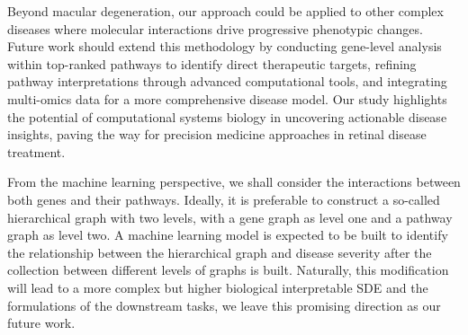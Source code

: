 \documentclass{article} %
\begin{document}
Beyond macular degeneration, our approach could be applied to other complex diseases where molecular interactions drive progressive phenotypic changes. Future work should extend this methodology by conducting gene-level analysis within top-ranked pathways to identify direct therapeutic targets, refining pathway interpretations through advanced computational tools, and integrating multi-omics data for a more comprehensive disease model. Our study highlights the potential of computational systems biology in uncovering actionable disease insights, paving the way for precision medicine approaches in retinal disease treatment.

From the machine learning perspective, we shall consider the interactions between both genes and their pathways. Ideally, it is preferable to construct a so-called hierarchical graph with two levels, with a gene graph as level one and a pathway graph as level two. A machine learning model is expected to be built to identify the relationship between the hierarchical graph and disease severity after the collection between different levels of graphs is built. Naturally, this modification will lead to a more complex but higher biological interpretable SDE and the formulations of the downstream tasks, we leave this promising direction as our future work.  

































\end{document}
